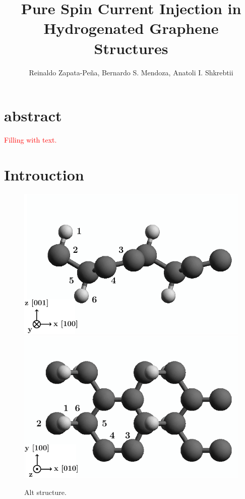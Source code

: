 \documentclass[twocolumn]{article}
\title{Pure Spin Current Injection in Hydrogenated Graphene Structures}
\author{Reinaldo Zapata-Pe\~na,
Bernardo S. Mendoza,
Anatoli I. Shkrebtii}
\date{}
\let\Oldsection\section
\renewcommand{\section}{\FloatBarrier\Oldsection}
\begin{document}
\maketitle

\section{abstract} %
\label{sec:abstract}
\textcolor{red}{{\huge Filling with text.}\\ \blindtext}

\section{Introuction} %
\label{sec:introuction}

\textcolor{red}{\blindtext}
\begin{figure}[ht!]
    \centering
    \includegraphics[width=\linewidth]{figures/altstruc2}
    \includegraphics[width=\linewidth]{figures/altstruc1}
    \caption{Alt structure.}
    \label{fig:altstruc}
\end{figure}
\end{document}
